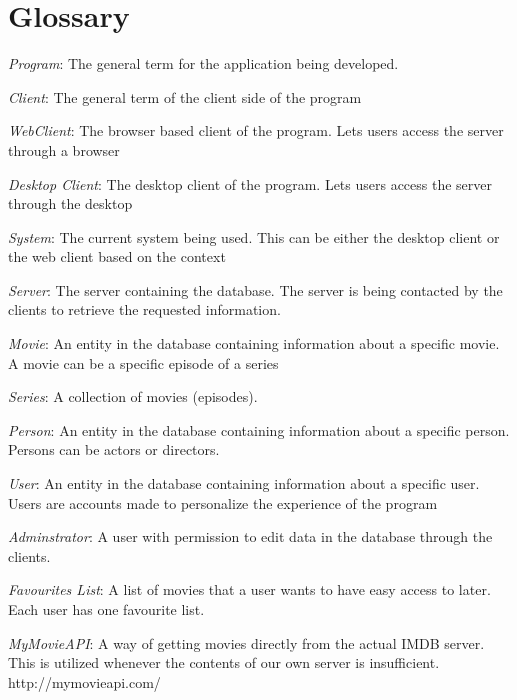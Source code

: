 \section{Glossary}
\label{sec:glossary}

\emph{Program}: The general term for the application being developed.

\emph{Client}: The general term of the client side of the program

\emph{WebClient}: The browser based client of the program. Lets users access the server through a browser

\emph{Desktop Client}: The desktop client of the program. Lets users access the server through the desktop

\emph{System}: The current system being used. This can be either the desktop client or the web client based on the context

\emph{Server}: The server containing the database. The server is being contacted by the clients to retrieve the requested information.

\emph{Movie}: An entity in the database containing information about a specific movie. A movie can be a specific episode of a series

\emph{Series}: A collection of movies (episodes).

\emph{Person}: An entity in the database containing information about a specific person. Persons can be actors or directors.

\emph{User}: An entity in the database containing information about a specific user. Users are accounts made to personalize the experience of the program

\emph{Adminstrator}: A user with permission to edit data in the database through the clients.

\emph{Favourites List}: A list of movies that a user wants to have easy access to later. Each user has one favourite list.

\emph{MyMovieAPI}: A way of getting movies directly from the actual IMDB server. This is utilized whenever the contents of our own server is insufficient. http://mymovieapi.com/
